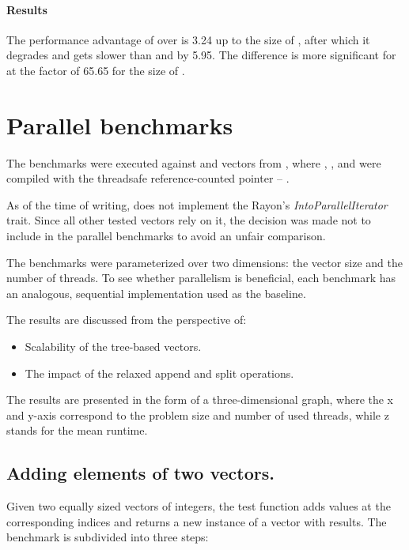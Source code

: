 
\paragraph{Results}
The performance advantage of \stdvec{} over \rrbvec{} is 3.24 up to the size of , after which it degrades and gets slower than \imrsvec{} and \rrbvec{} by 5.95. The difference is more significant for \rbvec{} at the factor of 65.65 for the size of .

\section{Parallel benchmarks}
\label{sec:par-benchmarks}
The benchmarks were executed against \stdvec{} and vectors from \pvecrs{}, where \rbvec{}, \rrbvec{}, and \pvec{} were compiled with the threadsafe reference-counted pointer -- \arc{}.

As of the time of writing, \imrsvec{} does not implement the Rayon's \emph{IntoParallelIterator} trait. Since all other tested vectors rely on it, the decision was made not to include \imrsvec{} in the parallel benchmarks to avoid an unfair comparison.

The benchmarks were parameterized over two dimensions: the vector size and the number of threads. To see whether parallelism is beneficial, each benchmark has an analogous, sequential implementation used as the baseline.

The results are discussed from the perspective of:
\begin{itemize}
    \item Scalability of the tree-based vectors.
    \item The impact of the relaxed append and split operations.
\end{itemize}

The results are presented in the form of a three-dimensional graph, where the x and y-axis correspond to the problem size and number of used threads, while z stands for the mean runtime.

\subsection{Adding elements of two vectors.}
Given two equally sized vectors of integers, the test function adds values at the corresponding indices and returns a new instance of a vector with results. The benchmark is subdivided into three steps:

